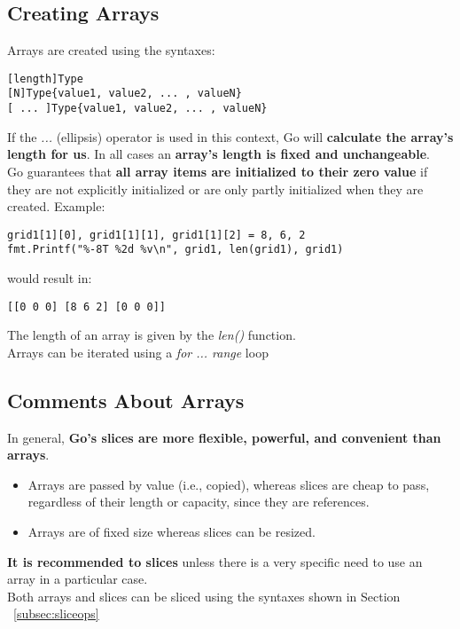 \documentclass[10pt,letterpaper]{report}
\begin{document}
\subsection{Creating Arrays}
Arrays are created using the syntaxes:
\begin{lstlisting}
[length]Type
[N]Type{value1, value2, ... , valueN}
[ ... ]Type{value1, value2, ... , valueN}
\end{lstlisting}
If the \textit{...} (ellipsis) operator is used in this context, Go will \textbf{calculate the array's length for us}. In all cases an \textbf{array's length is fixed and unchangeable}.\\
Go guarantees that \textbf{all array items are initialized to their zero value} if they are not explicitly initialized or are only partly initialized when they are created. Example:
\begin{lstlisting}
grid1[1][0], grid1[1][1], grid1[1][2] = 8, 6, 2
fmt.Printf("%-8T %2d %v\n", grid1, len(grid1), grid1)
\end{lstlisting}
would result in:
\begin{lstlisting}
[[0 0 0] [8 6 2] [0 0 0]]
\end{lstlisting}
The length of an array is given by the \textit{len()} function.\\
Arrays can be iterated using a \textit{for ... range} loop
\subsection{Comments About Arrays}
In general, \textbf{Go's slices are more flexible, powerful, and convenient than arrays}.\\
\begin{itemize}
\item Arrays are passed by value (i.e., copied), whereas slices are cheap to pass, regardless of their length or capacity, since they are references.
\item Arrays are of fixed size whereas slices can be resized.
\end{itemize}
\textbf{It is recommended to slices} unless there is a very specific need to use an array in a particular case.\\
Both arrays and slices can be sliced using the syntaxes shown in 
Section ~\ref{subsec:sliceops}
\end{document}
